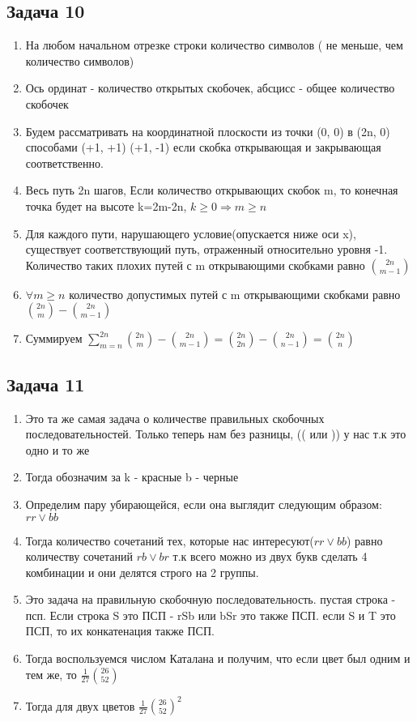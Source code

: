 \documentclass[a4paper,12pt]{article}
\begin{document}
\subsection{Задача 10}
\begin{enumerate}
    \item На любом начальном отрезке строки количество символов ( не меньше, чем количество символов)
    \item Ось ординат - количество открытых скобочек, абсцисс - общее количество скобочек
    \item Будем рассматривать на координатной плоскости из точки (0, 0) в (2n, 0) способами (+1, +1) (+1, -1) если скобка открывающая и закрывающая соответственно.
    \item Весь путь 2n шагов, Если количество открывающих скобок m, то конечная точка будет на высоте k=2m-2n, $k\ge 0 \Rightarrow m\ge n$ 
    \item Для каждого пути, нарушающего условие(опускается ниже оси x), существует соответствующий путь, отраженный относительно уровня -1. Количество таких плохих путей с m открывающими скобками равно $\binom{2n}{m-1}$
    \item $\forall m\ge n$ количество допустимых путей с m открывающими скобками равно $\binom{2n}{m}-\binom{2n}{m-1}$
    \item Суммируем $\sum_{m=n}^{2n} \binom{2n}{m}-\binom{2n}{m-1}=\binom{2n}{2n}-\binom{2n}{n-1}=\binom{2n}{n}$
\end{enumerate}

\subsection{Задача 11}
\begin{enumerate}
    \item Это та же самая задача о количестве правильных скобочных последовательностей. Только теперь нам без разницы, (( или )) у нас т.к это одно и то же
    \item Тогда обозначим за k - красные b - черные
    \item Определим пару убирающейся, если она выглядит следующим образом: $rr\lor bb$
    \item Тогда количество сочетаний тех, которые нас интересуют($rr\lor bb$) равно количеству сочетаний $rb \lor br$ т.к всего можно из двух букв сделать 4 комбинации и они делятся строго на 2 группы.
    \item Это задача на правильную скобочную последовательность. пустая строка - псп. Если строка S это ПСП - rSb или bSr это также ПСП. если S и T это ПСП, то их конкатенация также ПСП.
    \item Тогда воспользуемся числом Каталана и получим, что если цвет был одним и тем же, то $\frac{1}{27}\binom{26}{52}$
    \item Тогда для двух цветов $\frac{1}{27}\binom{26}{52}^2$
\end{enumerate}
\end{document}
